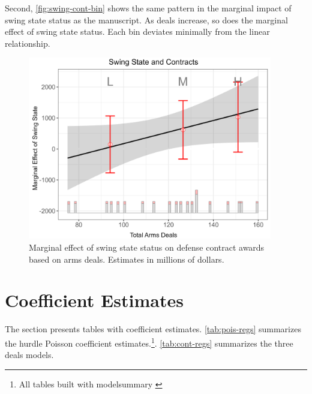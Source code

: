 \documentclass[12pt]{article}
\begin{document}
Second, \autoref{fig:swing-cont-bin} shows the same pattern in the marginal impact of swing state status as the manuscript. 
As deals increase, so does the marginal effect of swing state status. 
Each bin deviates minimally from the linear relationship. 


\begin{figure}[htpb]
	\centering
		\includegraphics[width=0.95\textwidth]{swing-cont-bin.png}
	\caption{Marginal effect of swing state status on defense contract awards based on arms deals. Estimates in millions of dollars.}
	\label{fig:swing-cont-bin}
\end{figure}


\newpage

\section{Coefficient Estimates}

The section presents tables with coefficient estimates. 
\autoref{tab:pois-regs} summarizes the hurdle Poisson coefficient estimates.\footnote{All tables built with modelsummary \citep{ArelBundock2022}}. 
\autoref{tab:cont-regs} summarizes the three deals models.









\newpage
\singlespace
 
 
\end{document}
